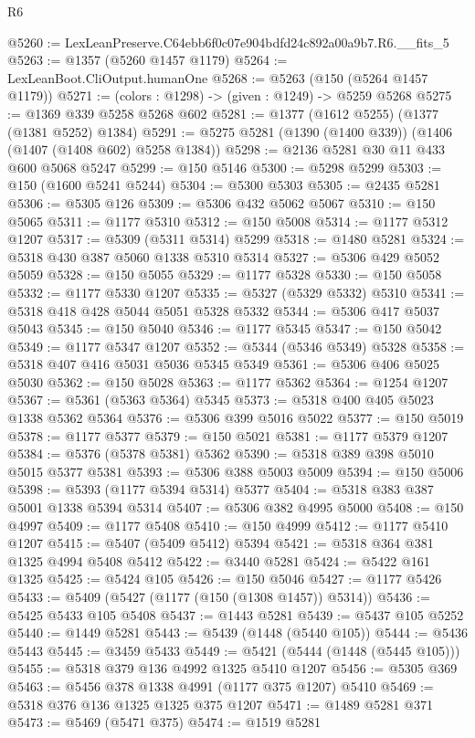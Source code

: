 \begin{lexlean}{R6}
\begin{coremodule}
@5260 := LexLeanPreserve.C64ebb6f0c07e904bdfd24c892a00a9b7.R6.__fits_5
@5263 := @1357 (@5260 @1457 @1179)
@5264 := LexLeanBoot.CliOutput.humanOne
@5268 := @5263 (@150 (@5264 @1457 @1179))
@5271 := (colors : @1298) -> (given : @1249) -> @5259 @5268
@5275 := @1369 @339 @5258 @5268 @602
@5281 := @1377 (@1612 @5255) (@1377 (@1381 @5252) @1384)
@5291 := @5275 @5281 (@1390 (@1400 @339)) (@1406 (@1407 (@1408 @602) @5258 @1384))
@5298 := @2136 @5281 @30 @11 @433 @600 @5068 @5247
@5299 := @150 @5146
@5300 := @5298 @5299
@5303 := @150 (@1600 @5241 @5244)
@5304 := @5300 @5303
@5305 := @2435 @5281
@5306 := @5305 @126
@5309 := @5306 @432 @5062 @5067
@5310 := @150 @5065
@5311 := @1177 @5310
@5312 := @150 @5008
@5314 := @1177 @5312 @1207
@5317 := @5309 (@5311 @5314) @5299
@5318 := @1480 @5281
@5324 := @5318 @430 @387 @5060 @1338 @5310 @5314
@5327 := @5306 @429 @5052 @5059
@5328 := @150 @5055
@5329 := @1177 @5328
@5330 := @150 @5058
@5332 := @1177 @5330 @1207
@5335 := @5327 (@5329 @5332) @5310
@5341 := @5318 @418 @428 @5044 @5051 @5328 @5332
@5344 := @5306 @417 @5037 @5043
@5345 := @150 @5040
@5346 := @1177 @5345
@5347 := @150 @5042
@5349 := @1177 @5347 @1207
@5352 := @5344 (@5346 @5349) @5328
@5358 := @5318 @407 @416 @5031 @5036 @5345 @5349
@5361 := @5306 @406 @5025 @5030
@5362 := @150 @5028
@5363 := @1177 @5362
@5364 := @1254 @1207
@5367 := @5361 (@5363 @5364) @5345
@5373 := @5318 @400 @405 @5023 @1338 @5362 @5364
@5376 := @5306 @399 @5016 @5022
@5377 := @150 @5019
@5378 := @1177 @5377
@5379 := @150 @5021
@5381 := @1177 @5379 @1207
@5384 := @5376 (@5378 @5381) @5362
@5390 := @5318 @389 @398 @5010 @5015 @5377 @5381
@5393 := @5306 @388 @5003 @5009
@5394 := @150 @5006
@5398 := @5393 (@1177 @5394 @5314) @5377
@5404 := @5318 @383 @387 @5001 @1338 @5394 @5314
@5407 := @5306 @382 @4995 @5000
@5408 := @150 @4997
@5409 := @1177 @5408
@5410 := @150 @4999
@5412 := @1177 @5410 @1207
@5415 := @5407 (@5409 @5412) @5394
@5421 := @5318 @364 @381 @1325 @4994 @5408 @5412
@5422 := @3440 @5281
@5424 := @5422 @161 @1325
@5425 := @5424 @105
@5426 := @150 @5046
@5427 := @1177 @5426
@5433 := @5409 (@5427 (@1177 (@150 (@1308 @1457)) @5314))
@5436 := @5425 @5433 @105 @5408
@5437 := @1443 @5281
@5439 := @5437 @105 @5252
@5440 := @1449 @5281
@5443 := @5439 (@1448 (@5440 @105))
@5444 := @5436 @5443
@5445 := @3459 @5433
@5449 := @5421 (@5444 (@1448 (@5445 @105)))
@5455 := @5318 @379 @136 @4992 @1325 @5410 @1207
@5456 := @5305 @369
@5463 := @5456 @378 @1338 @4991 (@1177 @375 @1207) @5410
@5469 := @5318 @376 @136 @1325 @1325 @375 @1207
@5471 := @1489 @5281 @371
@5473 := @5469 (@5471 @375)
@5474 := @1519 @5281

\end{coremodule}
\end{lexlean}
